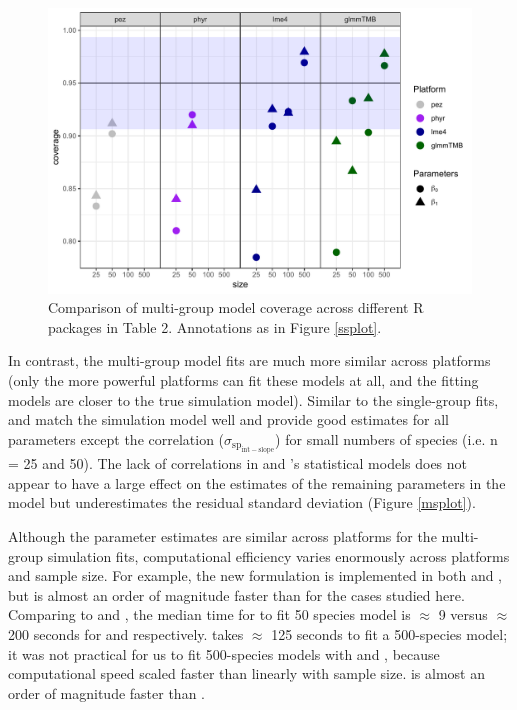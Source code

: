 \documentclass[12pt]{article}
\begin{document}
\begin{center}
\begin{figure}[H]
  \includegraphics[scale=0.8]{./figure/mscoverage.pdf}
  \caption{Comparison of multi-group model coverage across different R packages in Table 2. Annotations as in Figure \ref{ssplot}.}
  \label{msplot_coverage}
\end{figure}
\end{center}


In contrast, the multi-group model fits are much more similar across platforms (only the more powerful platforms can fit these models at all, and the fitting models are closer to the true simulation model).
Similar to the single-group fits,  and  match the simulation model well and provide good estimates for all parameters except the correlation ($\sigma_{\mathrm{sp_{int-slope}}}$) for small numbers of species (i.e. n = 25 and 50).
The lack of correlations in  and 's statistical models does not appear to have a large effect on the estimates of the remaining parameters in the model but underestimates the residual standard deviation (Figure \ref{msplot}).

Although the parameter estimates are similar across platforms for the multi-group simulation fits, computational efficiency varies enormously across platforms and sample size.
For example, the new formulation is implemented in both  and , but  is almost an order of magnitude faster than  for the cases studied here.
Comparing  to  and , the median time for  to fit 50 species model is $\approx$ 9 versus $\approx$ 200 seconds for  and  respectively. 
 takes $\approx$ 125 seconds to fit a 500-species model; it was not practical for us to fit 500-species models with  and , because computational speed scaled faster than linearly with sample size.
 is almost an order of magnitude faster than .
\end{document}
